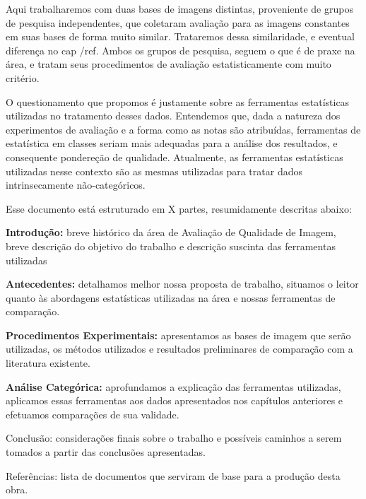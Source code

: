 	Aqui trabalharemos com duas bases de imagens distintas, proveniente de grupos de pesquisa independentes, que coletaram avaliação para as imagens constantes em suas bases de forma muito similar. Trataremos dessa similaridade, e eventual diferença no cap /ref{}. Ambos os grupos de pesquisa, seguem o que é de praxe na área, e tratam seus procedimentos de avaliação estatisticamente com muito critério.

	O questionamento que propomos é justamente sobre as ferramentas estatísticas utilizadas no tratamento desses dados. Entendemos que, dada a natureza dos experimentos de avaliação e a forma como as notas são atribuídas, ferramentas de estatística em classes seriam mais adequadas para a análise dos resultados, e consequente pondereção de qualidade. Atualmente, as ferramentas estatísticas utilizadas nesse contexto são as mesmas utilizadas para tratar dados intrinsecamente não-categóricos.

	

	Esse documento está estruturado em X partes, resumidamente descritas abaixo:

\begin{description}
\item{\bf Introdução: } breve histórico da área de Avaliação de Qualidade de Imagem, breve descrição do objetivo do trabalho e descrição suscinta das ferramentas utilizadas
\item{\bf Antecedentes: } detalhamos melhor nossa proposta de trabalho, situamos o leitor quanto às abordagens estatísticas utilizadas na área e nossas ferramentas de comparação.
\item{\bf Procedimentos Experimentais: } apresentamos as bases de imagem que serão utilizadas, os métodos utilizados e resultados preliminares de comparação com a literatura existente.
\item{\bf Análise Categórica: } aprofundamos a explicação das ferramentas utilizadas, aplicamos essas ferramentas aos dados apresentados nos capítulos anteriores e efetuamos comparações de sua validade.
\item{Conclusão: } considerações finais sobre o trabalho e possíveis caminhos a serem tomados a partir das conclusões apresentadas.
\item{Referências: } lista de documentos que serviram de base para a produção desta obra.
\end{description}
